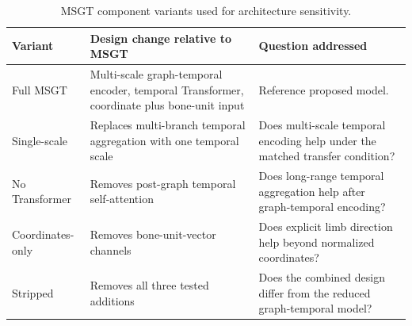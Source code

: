 \begin{table}[tb]
\centering
\footnotesize
\renewcommand{\arraystretch}{1.28}
\caption{MSGT component variants used for architecture sensitivity.}
\label{tab:variants}
\begin{tabularx}{\textwidth}{@{}p{}XX@{}}
\toprule
\rowcolor{headergray}
Variant & Design change relative to MSGT & Question addressed \\
\midrule
\rowcolor{msgthair}
Full MSGT & Multi-scale graph-temporal encoder, temporal Transformer, coordinate plus bone-unit input & Reference proposed model. \\
Single-scale & Replaces multi-branch temporal aggregation with one temporal scale & Does multi-scale temporal encoding help under the matched transfer condition? \\
No Transformer & Removes post-graph temporal self-attention & Does long-range temporal aggregation help after graph-temporal encoding? \\
Coordinates-only & Removes bone-unit-vector channels & Does explicit limb direction help beyond normalized coordinates? \\
Stripped & Removes all three tested additions & Does the combined design differ from the reduced graph-temporal model? \\
\bottomrule
\end{tabularx}
\end{table}
